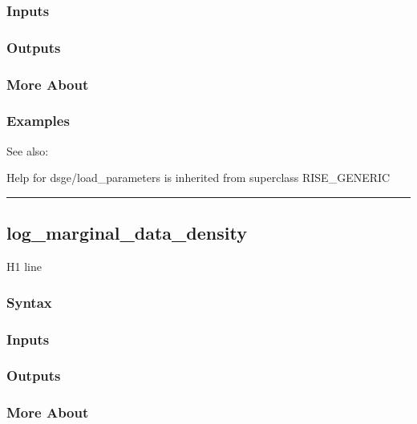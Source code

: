 \documentclass[letterpaper,10pt,english]{sphinxmanual}
\begin{document}
\subsubsection{Inputs}
\label{classes/models/@dsge/dsge:id82}

\subsubsection{Outputs}
\label{classes/models/@dsge/dsge:id83}

\subsubsection{More About}
\label{classes/models/@dsge/dsge:id84}

\subsubsection{Examples}
\label{classes/models/@dsge/dsge:id85}
See also:

Help for dsge/load\_parameters is inherited from superclass RISE\_GENERIC


\bigskip\hrule{}\bigskip



\subsection{log\_marginal\_data\_density}
\label{classes/models/@dsge/dsge:log-marginal-data-density}\label{classes/models/@dsge/dsge:id86}
H1 line


\subsubsection{Syntax}
\label{classes/models/@dsge/dsge:id87}

\subsubsection{Inputs}
\label{classes/models/@dsge/dsge:id88}

\subsubsection{Outputs}
\label{classes/models/@dsge/dsge:id89}

\subsubsection{More About}
\label{classes/models/@dsge/dsge:id90}
\end{document}
